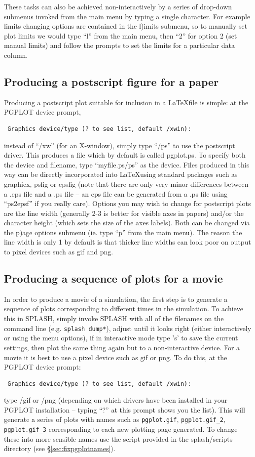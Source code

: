 \documentclass[a4paper,11pt]{article}
\begin{document}
 These tasks can also be achieved non-interactively by a series of drop-down submenus invoked from the main menu by typing a single character. For example limits changing options are contained in the l)imits submenu, so to manually set plot limits we would type ``l'' from the main menu, then ``2'' for option 2 (set manual limits) and follow the prompts to set the limits for a particular data column. 

\subsection{Producing a postscript figure for a paper}
 Producing a postscript plot suitable for inclusion in a \LaTeX  file is simple: at the PGPLOT device prompt, 
\begin{verbatim}
 Graphics device/type (? to see list, default /xwin):
\end{verbatim}
instead of ``/xw'' (for an X-window), simply type ``/ps'' to use the postscript driver. This produces a file which by default is called pgplot.ps. To specify both the device and filename, type ``myfile.ps/ps'' as the device. Files produced in this way can be directly incorporated into \LaTeX  using standard packages such as graphicx, psfig or epsfig (note that there are only very minor differences between a .eps file and a .ps file -- an eps file can be generated from a .ps file using ``ps2epsf'' if you really care). Options you may wish to change for postscript plots are the line width (generally 2-3 is better for visible axes in papers) and/or the character height (which sets the size of the axes labels). Both can be changed via the p)age options submenu (ie. type ``p'' from the main menu). The reason the line width is only 1 by default is that thicker line widths can look poor on output to pixel devices such as gif and png.

\subsection{Producing a sequence of plots for a movie}
\label{sec:movies} 
 In order to produce a movie of a simulation, the first step is to generate a sequence of plots corresponding to different times in the simulation. To achieve this in SPLASH, simply invoke SPLASH with all of the filenames on the command line (e.g. \verb+splash dump*+), adjust until it looks right (either interactively or using the menu options), if in interactive mode type 's' to save the current settings, then plot the same thing again but to a non-interactive device. For a movie it is best to use a pixel device such as gif or png. To do this, at the PGPLOT device prompt:
\begin{verbatim}
 Graphics device/type (? to see list, default /xwin):
\end{verbatim}
type /gif or /png (depending on which drivers have been installed in your PGPLOT installation -- typing ``?'' at this prompt shows you the list). This will generate a series of plots with names such as \verb+pgplot.gif+, \verb+pgplot.gif_2+, \verb+pgplot.gif_3+ corresponding to each new plotting page generated. To change these into more sensible names use the script provided in the splash/scripts directory (see \S\ref{sec:fixpgplotnames}). 
 
\end{document}
